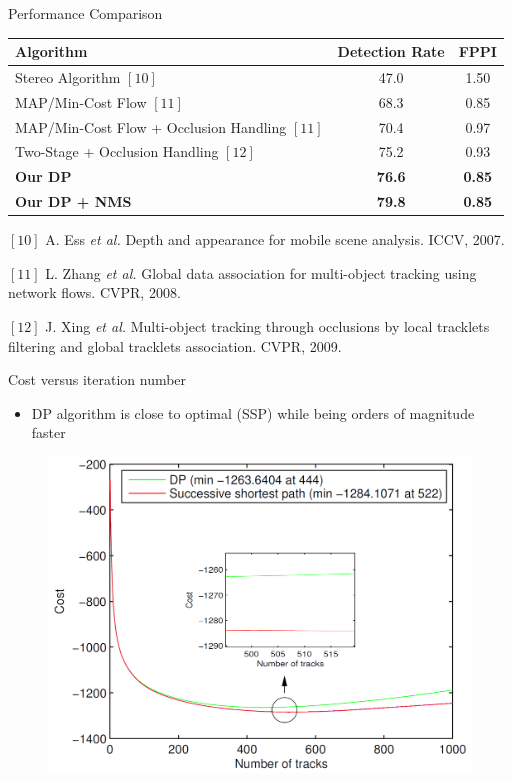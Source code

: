 \documentclass[aspectratio=43]{beamer}
\begin{document}
		
		\begin{frame}{Performance Comparison}
			
			\begin{table}
				\footnotesize\centering
				\begin{tabular}{lcc}
					\hline
					Algorithm & Detection Rate & FPPI \\ \hline
					Stereo Algorithm $[10]$ & 47.0 & 1.50 \\ 
					MAP/Min-Cost Flow $[11]$ & 68.3 & 0.85 \\ 
					MAP/Min-Cost Flow + Occlusion Handling $[11]$ & 70.4 & 0.97 \\ 
					Two-Stage + Occlusion Handling $[12]$ & 75.2 & 0.93 \\ 
					\textbf{Our DP} & \textbf{76.6} & \textbf{0.85} \\
					\textbf{Our DP + NMS} & \textbf{79.8} & \textbf{0.85} \\ \hline
				\end{tabular}
			\end{table}
			\vfill
			{\fontsize{4}{12} \selectfont
				$[10]$ A. Ess \textit{et al.} Depth and appearance for mobile scene analysis. ICCV, 2007. \\ \vspace{-1.5mm}
				
				$[11]$ L. Zhang \textit{et al.} Global data association for multi-object tracking using network flows. CVPR, 2008.  \\ \vspace{-2mm}
				
				$[12]$ J. Xing \textit{et al.} Multi-object tracking through occlusions by local tracklets filtering and global tracklets association. CVPR, 2009.
			}
		\end{frame}
		
		
		\begin{frame}{Cost versus iteration number}
			\begin{itemize}
				\item DP algorithm is close to optimal (SSP) while being orders of magnitude faster
			\end{itemize}
			\begin{figure}
				\centering
				\includegraphics[width=0.6\linewidth]{figures/experiments/cost_vs_iteration.png}
			\end{figure}
		\end{frame}
		
\end{document}
